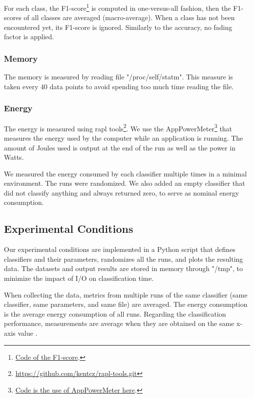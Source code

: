 For each class, the
F1-score\footnote{\href{https://github.com/azazel7/paper-benchmark/blob/9adb1039c5a65a00a66d554f0e870d14d3fff7cb/main.cpp\#L82}{Code of the F1-score}.} is
computed in
one-versus-all fashion, then the F1-scores of all classes are averaged (macro-average). When a
class has not been encountered yet, its F1-score is ignored. Similarly to the
accuracy, no fading factor is applied.

\subsubsection{Memory}
The memory is measured by reading file "/proc/self/statm". This measure is
taken every 40 data points to avoid spending too much time reading the file.

\subsubsection{Energy}
The energy is measured using rapl
tools\footnote{\url{https://github.com/kentcz/rapl-tools.git}}.
We use the
AppPowerMeter\footnote{\href{https://github.com/azazel7/paper-benchmark/blob/9adb1039c5a65a00a66d554f0e870d14d3fff7cb/makefile.py\#L122}{Code
is the use of AppPowerMeter here}.} that measures
the energy used by the computer while an
application is running. The amount of Joules used
is output at the end of the run as well as the
power in Watts.

We measured the energy consumed by each classifier
multiple times in a minimal environment. The runs
were randomized. We also added an empty
classifier that did not classify anything and always
returned zero, to serve as nominal energy consumption.

\subsection{Experimental Conditions}

Our experimental conditions are implemented in a Python script that defines
classifiers and their parameters, randomizes all the runs, and plots the
resulting data. The datasets and output results are stored in memory
through "/tmp", to minimize the impact of I/O on classification time.

When collecting the data, metrics from multiple
runs of the same classifier (same classifier, same
parameters, and same file) are averaged. The
energy consumption is the average energy
consumption of all runs. Regarding the
classification performance, measurements are
average when they are obtained on the same x-axis
value .

